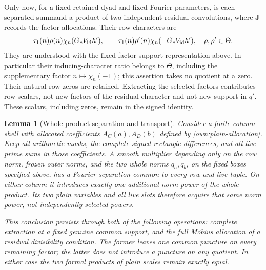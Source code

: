 \documentclass[12pt]{article}
\newtheorem{lemma}[theorem]{Lemma}
\begin{document}
Only now, for a fixed retained dyad and fixed Fourier parameters,
is each separated summand a product of two independent residual
convolutions, where \(\mathbf J\) records the factor allocations.
Their row characters are
\[
 \tau_1(n)\rho(n)\chi_n(G_cV_{\rm id}h'),\qquad
 \tau_1(n)\rho'(n)\chi_n(-G_cV_{\rm id}h'),
 \quad \rho,\rho'\in\Theta.
\]
They are understood with the fixed-factor support representation
above.  In particular their inducing-character ratio belongs to
\(\Theta\), including the supplementary factor
\(n\mapsto\chi_n(-1)\); this assertion takes no quotient at a zero.
Their natural row zeros are retained.  Extracting
the selected factors contributes row scalars, not new factors of the
residual character and not new support in \(q'\).  These scalars,
including zeros, remain in the signed identity.

\begin{lemma}[Whole-product separation and transport]
\label{lem:whole-product-transport}
Consider a finite column shell with allocated coefficients
\(A_C(a),A_D(b)\) defined by \eqref{own:plain-allocation}.
Keep all arithmetic masks, the complete signed rectangle
differences, and all live prime sums in those coefficients.
A smooth multiplier depending only on the row norm, frozen outer
norms, and the two whole norms \(q_a,q_b\), on the fixed boxes
specified above, has a Fourier separation common to every row and
live tuple.  On either column it introduces exactly one additional
norm power of the whole product.  Its two plain variables and all
live slots therefore acquire that same norm power, not independently
selected powers.

This conclusion persists through both of the following operations:
complete extraction at a fixed genuine common support, and the full
M\"obius allocation of a residual divisibility condition.  The former
leaves one common puncture on every remaining factor; the latter
does not introduce a puncture on any quotient.  In either case the
two formal products of plain scales remain exactly equal.
\end{lemma}
\end{document}
